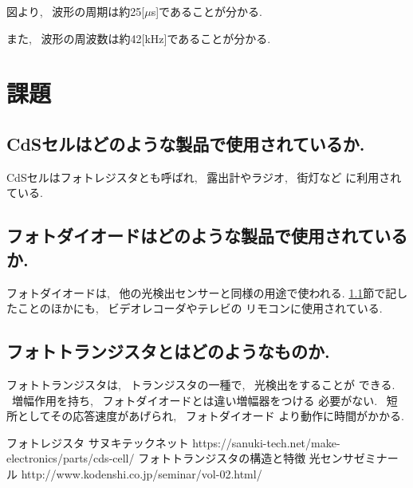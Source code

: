 \documentclass[titlepage]{jsarticle}
\begin{document}
            図より, ~波形の周期は約25[$\mu$s]であることが分かる.

            また, ~波形の周波数は約42[kHz]であることが分かる.

\section{課題}
    \subsection{CdSセルはどのような製品で使用されているか.} \label{課題1}
        CdSセルはフォトレジスタとも呼ばれ, ~露出計やラジオ, ~街灯など
        に利用されている.

    \subsection{フォトダイオードはどのような製品で使用されているか.}
        フォトダイオードは, ~他の光検出センサーと同様の用途で使われる.
        \ref{課題1}節で記したことのほかにも, ~ビデオレコーダやテレビの
        リモコンに使用されている.

    \subsection{フォトトランジスタとはどのようなものか.}
        フォトトランジスタは, ~トランジスタの一種で, ~光検出をすることが
        できる. ~増幅作用を持ち, ~フォトダイオードとは違い増幅器をつける
        必要がない. ~短所としてその応答速度があげられ, ~フォトダイオード
        より動作に時間がかかる.

\begin{thebibliography}{99}
     フォトレジスタ サヌキテックネット https://sanuki-tech.net/make-electronics/parts/cds-cell/
     フォトトランジスタの構造と特徴 光センサゼミナール http://www.kodenshi.co.jp/seminar/vol-02.html/
\end{thebibliography}
\end{document}
